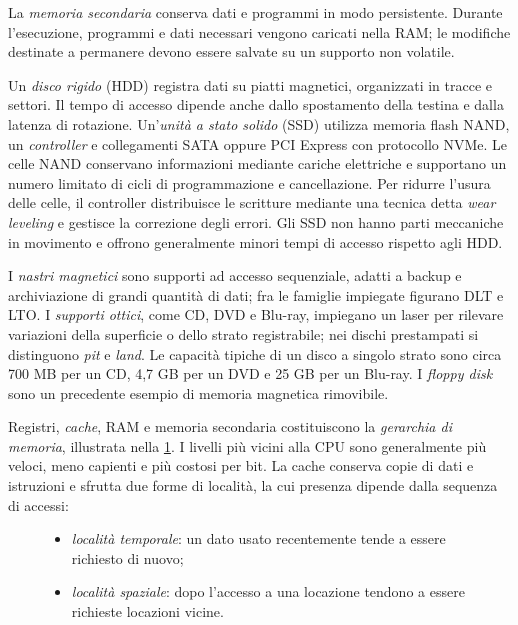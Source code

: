 La \emph{memoria secondaria} conserva dati e programmi in modo
persistente. Durante l'esecuzione, programmi e dati necessari vengono
caricati nella RAM; le modifiche destinate a permanere devono essere
salvate su un supporto non volatile.

Un \emph{disco rigido} (HDD) registra dati su piatti magnetici,
organizzati in tracce e settori. Il tempo di accesso dipende anche
dallo spostamento della testina e dalla latenza di rotazione.
Un'\emph{unità a stato solido} (SSD) utilizza memoria flash NAND,
un \emph{controller} e collegamenti SATA oppure PCI Express con
protocollo NVMe. Le celle NAND conservano informazioni mediante
cariche elettriche e supportano un numero limitato di cicli di
programmazione e cancellazione. Per ridurre l'usura delle celle,
il controller distribuisce le scritture mediante una tecnica detta
\emph{wear leveling} e gestisce la correzione degli errori.
Gli SSD non hanno parti meccaniche in movimento e offrono generalmente
minori tempi di accesso rispetto agli HDD.

I \emph{nastri magnetici} sono supporti ad accesso sequenziale,
adatti a backup e archiviazione di grandi quantità di dati; fra le
famiglie impiegate figurano DLT e LTO. I \emph{supporti ottici},
come CD, DVD e Blu-ray, impiegano un laser per rilevare variazioni
della superficie o dello strato registrabile; nei dischi prestampati
si distinguono \emph{pit} e \emph{land}. Le capacità tipiche di un
disco a singolo strato sono circa 700 MB per un CD, 4,7 GB per un
DVD e 25 GB per un Blu-ray. I \emph{floppy disk} sono un precedente
esempio di memoria magnetica rimovibile.

\clearpage

Registri, \emph{cache}, RAM e memoria secondaria costituiscono la
\emph{gerarchia di memoria}, illustrata nella
\cref{fig:fi-gerarchia-memoria}. I livelli più vicini alla CPU sono
generalmente più veloci, meno capienti e più costosi per bit.
La cache conserva copie di dati e istruzioni e sfrutta due forme di
località, la cui presenza dipende dalla sequenza di accessi:
\begin{figure}[htbp]
  \begin{minipage}[c]{0.48\textwidth}
    \begin{itemize}
      \item \emph{località temporale}: un dato usato recentemente
            tende a essere richiesto di nuovo;
      \item \emph{località spaziale}: dopo l'accesso a una locazione
            tendono a essere richieste locazioni vicine.
    \end{itemize}
  \end{minipage}
  \hfill
  \begin{minipage}[c]{0.48\textwidth}
    \centering
    \resizebox{0.95\linewidth}{!}{%
    }

    \label{fig:fi-gerarchia-memoria}
  \end{minipage}
\end{figure}

